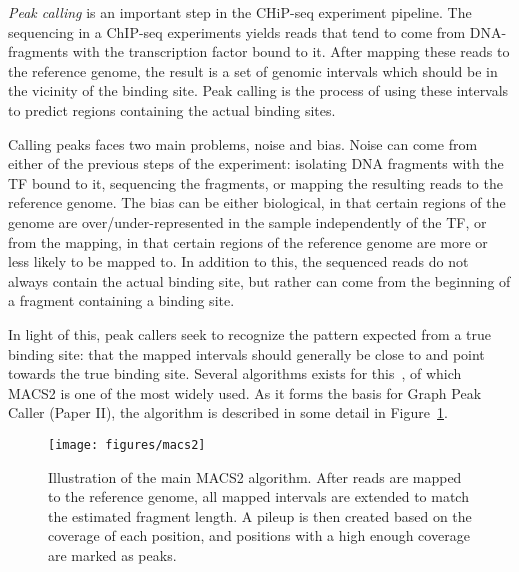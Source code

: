 \emph{Peak calling} is an important step in the CHiP-seq experiment pipeline.
The sequencing in a ChIP-seq experiments yields reads that tend to come from DNA-fragments with the transcription factor bound to it.
After mapping these reads to the reference genome, the result is a set of genomic intervals which should be in the vicinity of the binding site.
Peak calling is the process of using these intervals to predict regions containing the actual binding sites. 

Calling peaks faces two main problems, noise and bias.
Noise can come from either of the previous steps of the experiment: isolating DNA fragments with the TF bound to it, sequencing the fragments, or mapping the resulting reads to the reference genome.
The bias can be either biological, in that certain regions of the genome are over/under-represented in the sample independently of the TF, or from the mapping, in that certain regions of the reference genome are more or less likely to be mapped to.
In addition to this, the sequenced reads do not always contain the actual binding site, but rather can come from the beginning of a fragment containing a binding site. 

In light of this, peak callers seek to recognize the pattern expected from a true binding site: that the mapped intervals should generally be close to and point towards the true binding site.
Several algorithms exists for this~\cite{SPP, macs}, of which MACS2 is one of the most widely used.
As it forms the basis for Graph Peak Caller (Paper II), the algorithm is described in some detail in Figure~\ref{fig:macs}.

\begin{figure}
  \texttt{[image: figures/macs2]}
  \caption{
    Illustration of the main MACS2 algorithm.
    After reads are mapped to the reference genome, all mapped intervals are extended to match the estimated fragment length.
    A pileup is then created based on the coverage of each position, and positions with a high enough coverage are marked as peaks.}
  \label{fig:macs}
\end{figure}

% 
% 
% 
% 
% 
% 
% 
% 
% 
% 
% 
% 
% 
% 
% 
% 
% 
% 
% 
% 
% 
% 
% 
% 
% 
% 
% 
% 
% 
% 
% 
% 
% 
% 
% 
% 
% 
% 
% 
% 
% 
% 
% 
% 
% 
% 
% 
% 
% 
% 
% 
% 
% 
% 
% 
% 
% 
% 
% 
% 
% 
% 
% 
% 
% 
% 
% 
% 
% 
% 
% 
% 
% 
% 
% 
% 
% 
% 
% 
% 
% 
% 
% 
% 
% 
% 
% 
% 
% 
% 
% 
% 
% 
% 
% 
% 
% 
% 
% 
% 
% 
% 
% 
% 
% 
% 
% 
% 
% 
% 

